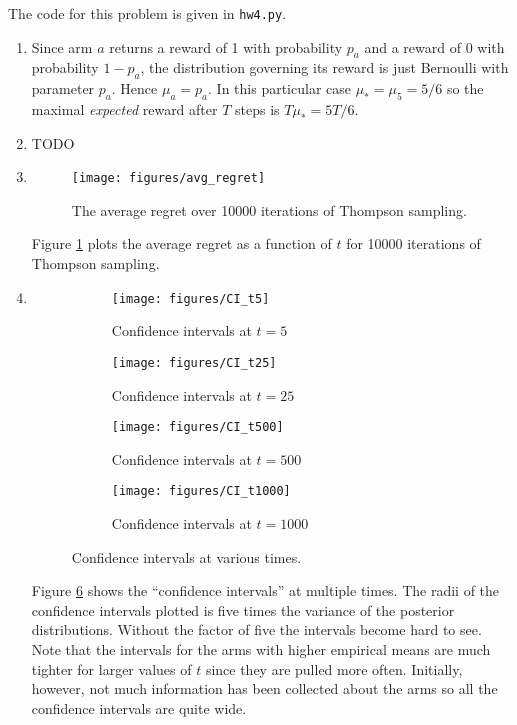 \documentclass{article}
\begin{document}
The code for this problem is given in {\tt hw4.py}.
\begin{enumerate}
	\item Since arm $a$ returns a reward of 1 with probability $p_a$ and a reward of 0 with probability $1-p_a$, the distribution governing its reward is just Bernoulli with parameter $p_a$. Hence $\mu_a=p_a$. In this particular case $\mu_*=\mu_5=5/6$ so the maximal \emph{expected} reward after $T$ steps is $T\mu_*=5T/6$.

	\item TODO

	\item 
	\begin{figure}
		\centering
		\texttt{[image: figures/avg\_regret]}
		\caption{The average regret over 10000 iterations of Thompson sampling.} 
		\label{fig:avg_regret}
	\end{figure}
	Figure \ref{fig:avg_regret} plots the average regret as a function of $t$ for 10000 iterations of Thompson sampling.

	\item 
	\begin{figure}
		\centering
		\begin{subfigure}{0.49\textwidth}
			\centering
			\texttt{[image: figures/CI\_t5]}
			\caption{Confidence intervals at $t=5$} 
			\label{fig:CI_t5}
		\end{subfigure}
		\begin{subfigure}{0.49\textwidth}
			\centering
			\texttt{[image: figures/CI\_t25]}
			\caption{Confidence intervals at $t=25$} 
			\label{fig:CI_t25}
		\end{subfigure}
		\begin{subfigure}{0.49\textwidth}
			\centering
			\texttt{[image: figures/CI\_t500]}
			\caption{Confidence intervals at $t=500$} 
			\label{fig:CI_t500}
		\end{subfigure}
		\begin{subfigure}{0.49\textwidth}
			\centering
			\texttt{[image: figures/CI\_t1000]}
			\caption{Confidence intervals at $t=1000$} 
			\label{fig:CI_t1000}
		\end{subfigure}
		\caption{Confidence intervals at various times.}
		\label{fig:CIs}
	\end{figure}

	Figure \ref{fig:CIs} shows the ``confidence intervals'' at multiple times. The radii of the confidence intervals plotted is five times the variance of the posterior distributions. Without the factor of five the intervals become hard to see. Note that the intervals for the arms with higher empirical means are much tighter for larger values of $t$ since they are pulled more often. Initially, however, not much information has been collected about the arms so all the confidence intervals are quite wide.


\end{enumerate}
\end{document}
